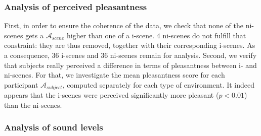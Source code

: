 \documentclass[12pt]{elsarticle}
\begin{document}
\subsubsection*{Analysis of perceived pleasantness}


First, in order to ensure the coherence of the data, we check that none of the ni-scenes gets a $\mathcal{A}_{scene}$ higher than one of a i-scene. 4 ni-scenes do not fulfill that constraint: they are thus removed, together with their corresponding i-scenes. As a consequence, 36 i-scenes and 36 ni-scenes remain for analysis. Second, we verify that subjects really perceived a difference in terms of pleasantness between i- and ni-scenes. For that, we investigate the mean pleasantness score for each participant $\mathcal{A}_{subject}$, computed separately for each type of environment. It indeed appears that the i-scenes were perceived significantly more pleasant ($p < 0.01$) than the ni-scenes.


\subsubsection*{Analysis of sound levels}
\end{document}
